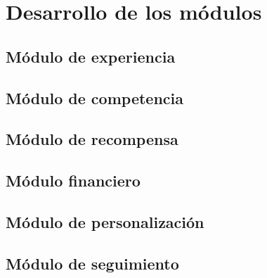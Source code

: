 
\chapter{Desarrollo de los módulos}\label{mod:concentrado}

    \section{Módulo de experiencia}\label{mod:exp}
    

    \section{Módulo de competencia}\label{mod:comp}
    

    \section{Módulo de recompensa}\label{mod:recomp}

    \section{Módulo financiero}\label{mod:financ}
    

    \section{Módulo de personalización}\label{mod:pers}
    


    \section{Módulo de seguimiento}\label{mod:seguim}
    
